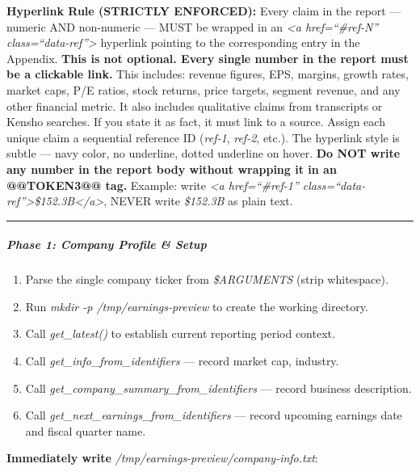 \documentclass[11pt]{article}
\begin{document}
\textbf{Hyperlink Rule (STRICTLY ENFORCED):} Every claim in the report — numeric AND non-numeric — MUST be wrapped in an \emph{<a href=``\#ref-N'' class=``data-ref''>} hyperlink pointing to the corresponding entry in the Appendix. \textbf{This is not optional. Every single number in the report must be a clickable link.} This includes: revenue figures, EPS, margins, growth rates, market caps, P/E ratios, stock returns, price targets, segment revenue, and any other financial metric. It also includes qualitative claims from transcripts or Kensho searches. If you state it as fact, it must link to a source. Assign each unique claim a sequential reference ID (\emph{ref-1}, \emph{ref-2}, etc.). The hyperlink style is subtle — navy color, no underline, dotted underline on hover. \textbf{Do NOT write any number in the report body without wrapping it in an @@TOKEN3@@ tag.} Example: write \emph{<a href=``\#ref-1'' class=``data-ref''>\$152.3B</a>}, NEVER write \emph{\$152.3B} as plain text.


\vspace{0.5em}\hrule\vspace{0.5em}

\subparagraph{Phase 1: Company Profile \& Setup}\mbox{}\par

\begin{enumerate}[leftmargin=*,itemsep=2pt,topsep=2pt]
\item {} Parse the single company ticker from \emph{\$ARGUMENTS} (strip whitespace).
\item {} Run \emph{mkdir -p /tmp/earnings-preview} to create the working directory.
\item {} Call \emph{get\_\allowbreak{}latest()} to establish current reporting period context.
\item {} Call \emph{get\_\allowbreak{}info\_\allowbreak{}from\_\allowbreak{}identifiers} — record market cap, industry.
\item {} Call \emph{get\_\allowbreak{}company\_\allowbreak{}summary\_\allowbreak{}from\_\allowbreak{}identifiers} — record business description.
\item {} Call \emph{get\_\allowbreak{}next\_\allowbreak{}earnings\_\allowbreak{}from\_\allowbreak{}identifiers} — record upcoming earnings date and fiscal quarter name.
\end{enumerate}

\textbf{Immediately write} \emph{/tmp/earnings-preview/company-info.txt}:
\end{document}
